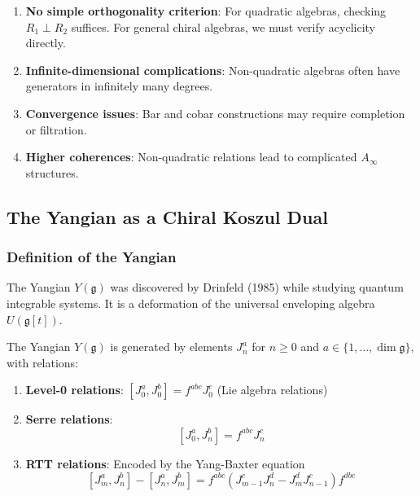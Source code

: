 \begin{enumerate}
\item \textbf{No simple orthogonality criterion}: For quadratic algebras, checking $R_1 \perp R_2$ suffices. For general chiral algebras, we must verify acyclicity directly.

\item \textbf{Infinite-dimensional complications}: Non-quadratic algebras often have generators in infinitely many degrees.

\item \textbf{Convergence issues}: Bar and cobar constructions may require completion or filtration.

\item \textbf{Higher coherences}: Non-quadratic relations lead to complicated $A_\infty$ structures.
\end{enumerate}


\subsection{The Yangian as a Chiral Koszul Dual}

\subsubsection{Definition of the Yangian}

The Yangian $Y(\mathfrak{g})$ was discovered by Drinfeld (1985) while studying quantum integrable systems. It is a deformation of the universal enveloping algebra $U(\mathfrak{g}[t])$.

\begin{definition}
The Yangian $Y(\mathfrak{g})$ is generated by elements $J_n^a$ for $n \geq 0$ and $a \in \{1,\ldots,\dim\mathfrak{g}\}$, with relations:
\begin{enumerate}
\item \textbf{Level-0 relations}: $[J_0^a, J_0^b] = f^{abc}J_0^c$ (Lie algebra relations)

\item \textbf{Serre relations}: 
$$[J_0^a, J_n^b] = f^{abc}J_n^c$$

\item \textbf{RTT relations}: Encoded by the Yang-Baxter equation
$$[J_m^a, J_n^b] - [J_n^a, J_m^b] = f^{abc}(J_{m-1}^cJ_n^d - J_m^dJ_{n-1}^c)f^{dbc}$$
\end{enumerate}
\end{definition}

